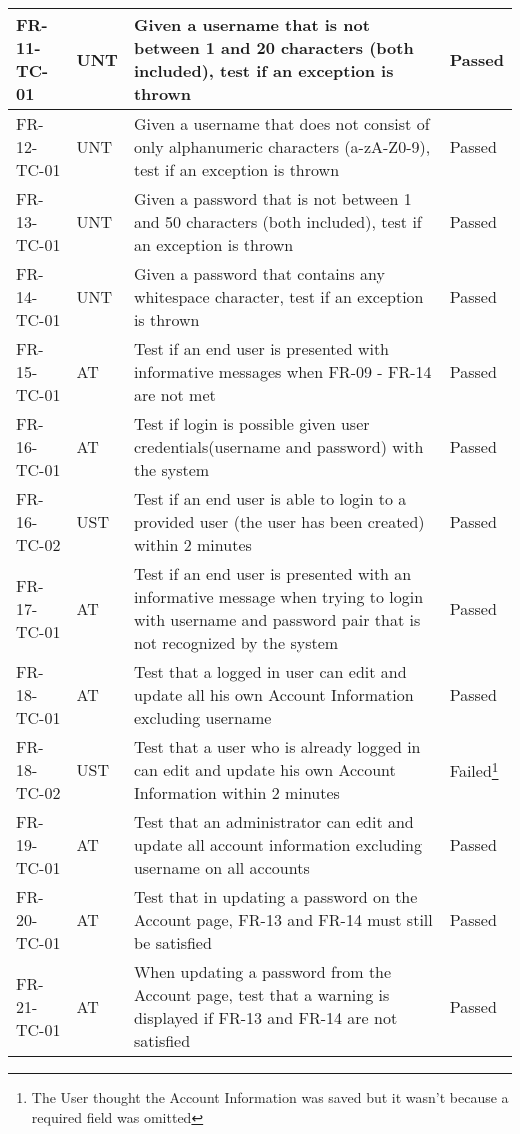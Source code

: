 \documentclass[../report.tex]{subfiles}
\begin{document}
\begin{longtable}{|L{2.1cm}|L{1cm}|L{12.4cm}|L{1.4cm}|}
FR-11-TC-01&UNT&Given a username that is not between 1 and 20 characters (both included), test if an exception is thrown&Passed  \\ \hline
FR-12-TC-01&UNT&Given a username that does not consist of only alphanumeric characters (a-zA-Z0-9), test if an exception is thrown&Passed  \\ \hline
FR-13-TC-01&UNT&Given a password that is not between 1 and 50 characters (both included), test if an exception is thrown&Passed  \\ \hline
FR-14-TC-01&UNT&Given a password that contains any whitespace character, test if an exception is thrown&Passed  \\ \hline
FR-15-TC-01&AT&Test if an end user is presented with informative messages when FR-09 - FR-14 are not met&Passed  \\ \hline
FR-16-TC-01&AT&Test if login is possible given user credentials(username and password) with the system&Passed  \\ \hline
FR-16-TC-02&UST&Test if an end user is able to login to a provided user (the user has been created) within 2 minutes&Passed  \\ \hline
FR-17-TC-01&AT&Test if an end user is presented with an informative message when trying to login with username and password pair that is not recognized by the system&Passed  \\ \hline
FR-18-TC-01&AT&Test that a logged in user can edit and update all his own Account Information excluding username&Passed  \\ \hline
FR-18-TC-02&UST&Test that a user who is already logged in can edit and update his own Account Information within 2 minutes&Failed\footnote{The User thought the Account Information was saved but it wasn't because a required field was omitted}  \\ \hline
FR-19-TC-01&AT&Test that an administrator can edit and update all account information excluding username on all accounts&Passed  \\ \hline
FR-20-TC-01&AT&Test that in updating a password on the Account page, FR-13 and FR-14 must still be satisfied&Passed  \\ \hline
FR-21-TC-01&AT&When updating a password from the Account page, test that a warning is displayed if FR-13 and FR-14 are not satisfied&Passed  \\ \hline

\end{longtable}
\end{document}
